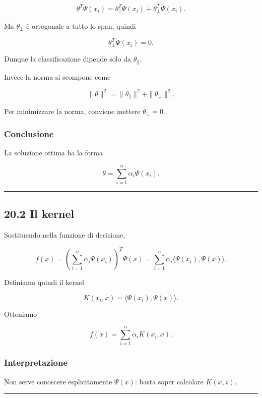 \documentclass[
]{article}
\begin{document}
\[
\theta^T\Psi(x_i)
=
\theta_{\parallel}^T\Psi(x_i) + \theta_{\perp}^T\Psi(x_i).
\]

Ma \(\theta_{\perp}\) è ortogonale a tutto lo span, quindi

\[
\theta_{\perp}^T\Psi(x_i)=0.
\]

Dunque la classificazione dipende solo da \(\theta_{\parallel}\).

Invece la norma si scompone come

\[
\|\theta\|^2 = \|\theta_{\parallel}\|^2 + \|\theta_{\perp}\|^2.
\]

Per minimizzare la norma, conviene mettere \(\theta_{\perp}=0\).

\subsubsection{Conclusione}\label{conclusione-9}

La soluzione ottima ha la forma

\[
\theta = \sum_{i=1}^n \alpha_i \Psi(x_i).
\]

\begin{center}\rule{0.5\linewidth}{0.5pt}\end{center}

\subsection{20.2 Il kernel}\label{il-kernel}

Sostituendo nella funzione di decisione,

\[
f(x)
=
\left(\sum_{i=1}^n \alpha_i \Psi(x_i)\right)^T \Psi(x)
=
\sum_{i=1}^n \alpha_i \langle \Psi(x_i),\Psi(x)\rangle.
\]

Definiamo quindi il kernel

\[
K(x_i,x)=\langle \Psi(x_i),\Psi(x)\rangle.
\]

Otteniamo

\[
f(x)=\sum_{i=1}^n \alpha_i K(x_i,x).
\]

\subsubsection{Interpretazione}\label{interpretazione-7}

Non serve conoscere esplicitamente \(\Psi(x)\): basta saper calcolare
\(K(x,z)\).

\begin{center}\rule{0.5\linewidth}{0.5pt}\end{center}
\end{document}
